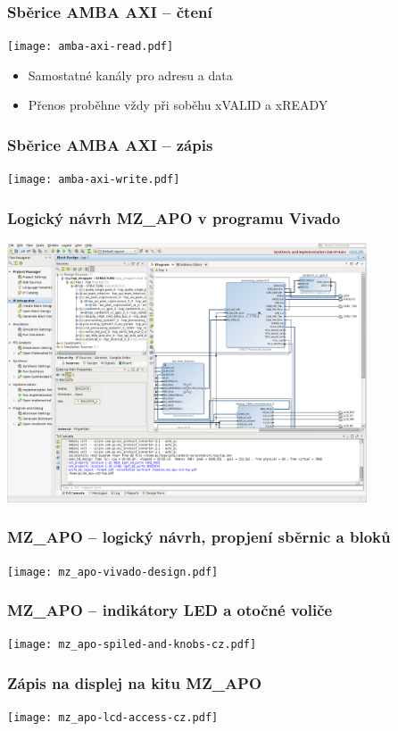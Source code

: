 \documentclass{beamer}
\begin{document}
\begin{frame}
\frametitle{Sběrice AMBA AXI -- čtení}

\begin{center}
\texttt{[image: amba-axi-read.pdf]}
\end{center}

\begin{itemize}
\item Samostatné kanály pro adresu a data
\item Přenos proběhne vždy při soběhu xVALID a xREADY
\end{itemize}

\end{frame}

\begin{frame}
\frametitle{Sběrice AMBA AXI -- zápis}

\begin{center}
\texttt{[image: amba-axi-write.pdf]}
\end{center}

\end{frame}

\begin{frame}
\frametitle{Logický návrh MZ\_APO v programu Vivado}
  \begin{center}
    \includegraphics[width=0.8\textwidth]{fig/mz_apo-vivado-screenshot.png}
  \end{center}
\end{frame}

\begin{frame}
\frametitle{MZ\_APO -- logický návrh, propjení sběrnic a bloků}

\texttt{[image: mz\_apo-vivado-design.pdf]}

\end{frame}


\begin{frame}
\frametitle{MZ\_APO -- indikátory LED a otočné voliče}

\texttt{[image: mz\_apo-spiled-and-knobs-cz.pdf]}

\end{frame}

\begin{frame}
\frametitle{Zápis na displej na kitu MZ\_APO}

\texttt{[image: mz\_apo-lcd-access-cz.pdf]}

\end{frame}
\end{document}
